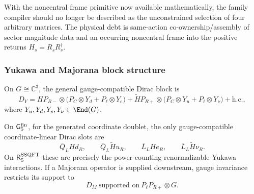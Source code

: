 \documentclass[12pt,a4paper]{article}
\begin{document}
\begin{remark}
\label{p5:rem:v391-narrowed-family-obligation}
With the noncentral frame primitive now available mathematically, the family
compiler should no longer be described as the unconstrained selection of four
arbitrary matrices.  The physical debt is same-action co-ownership/assembly
of sector magnitude data and an occurring noncentral frame into the positive
returns $H_s=R_sR_s^\dagger$.
\end{remark}


































\subsubsection{Yukawa and Majorana block structure}
\label{p5:sec:part1-yukawa}

On \(G\cong\mathbb C^3\), the general gauge-compatible Dirac block is
\begin{equation}
\label{p5:eq:part1-Dirac-Yukawa}
D_Y=
H P_{R-}\otimes\bigl(P_C\otimes Y_d+P_\ell\otimes Y_e\bigr)
+\widetilde H P_{R+}\otimes\bigl(P_C\otimes Y_u+P_\ell\otimes Y_\nu\bigr)
+\mathrm{h.c.},
\end{equation}
where \(Y_u,Y_d,Y_e,Y_\nu\in\End(G)\).

\begin{theorem}
\label{p5:thm:part1-yukawa-majorana-unique}
On \(\mathsf G_5^{\rm fin}\), for the generated
coordinate doublet, the only
gauge-compatible coordinate-linear Dirac slots are
\[
\bar Q_LHd_R,
\qquad
\bar Q_L\widetilde H u_R,
\qquad
\bar L_LHe_R,
\qquad
\bar L_L\widetilde H\nu_R.
\]
On \(\mathsf R_5^{\rm SSQFT}\) these are precisely the power-counting
renormalizable Yukawa interactions.
If a Majorana operator is supplied downstream, gauge invariance restricts its
support to
\begin{equation}
\label{p5:eq:part1-Majorana-slot}
D_M\ \text{supported on}\ P_\ell P_{R+}\otimes G.
\end{equation}
\end{theorem}
\end{document}
